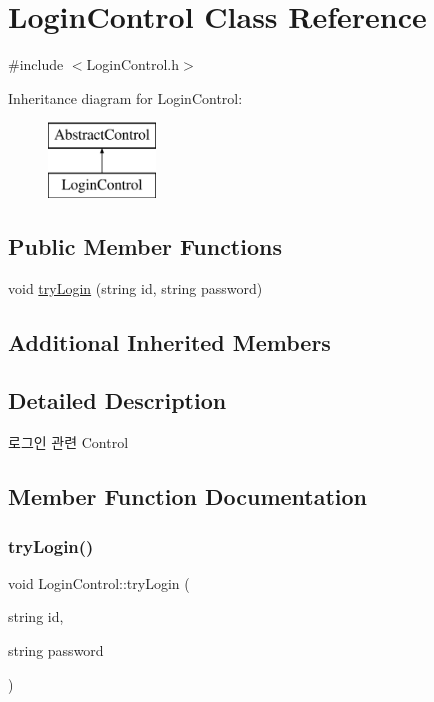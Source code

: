 \hypertarget{class_login_control}{}\section{Login\+Control Class Reference}
\label{class_login_control}


{\ttfamily \#include $<$Login\+Control.\+h$>$}

Inheritance diagram for Login\+Control\+:\begin{figure}[H]
\begin{center}
\leavevmode
\includegraphics[height=2.000000cm]{class_login_control}
\end{center}
\end{figure}
\subsection*{Public Member Functions}
\begin{DoxyCompactItemize}
\item 
void \mbox{\hyperlink{class_login_control_aff5b73021c402918a3e6de18b326367f}{try\+Login}} (string id, string password)
\end{DoxyCompactItemize}
\subsection*{Additional Inherited Members}


\subsection{Detailed Description}
로그인 관련 Control 

\subsection{Member Function Documentation}
\mbox{\label{class_login_control_aff5b73021c402918a3e6de18b326367f}} 
\subsubsection{\texorpdfstring{try\+Login()}{tryLogin()}}
{\footnotesize\ttfamily void Login\+Control\+::try\+Login (\begin{DoxyParamCaption}\item[{string}]{id,  }\item[{string}]{password }\end{DoxyParamCaption})}

